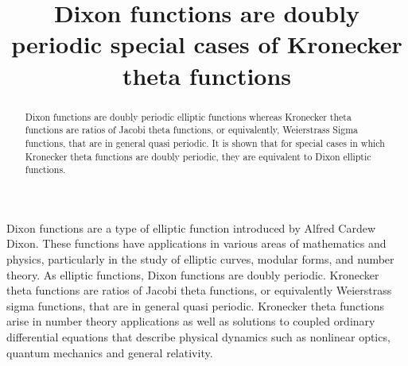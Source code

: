 \documentclass[]{article}
\title{Dixon functions are doubly periodic special cases of Kronecker theta functions}
\author{}
\begin{document}
\maketitle

\begin{abstract}
Dixon functions are doubly periodic elliptic functions whereas Kronecker theta functions are ratios of Jacobi theta functions, or equivalently, Weierstrass Sigma functions, that are in general quasi periodic. It is shown that for special cases in which Kronecker theta functions are doubly periodic, they are equivalent to Dixon elliptic functions.
\end{abstract}

\section{}
Dixon functions are a type of elliptic function introduced by Alfred Cardew Dixon. These functions have applications in various areas of mathematics and physics, particularly in the study of elliptic curves, modular forms, and number theory. As elliptic functions, Dixon functions are doubly periodic. Kronecker theta functions are ratios of Jacobi theta functions, or equivalently Weierstrass sigma functions, that are in general quasi periodic. Kronecker theta functions arise in number theory applications as well as solutions to coupled ordinary differential equations that describe physical dynamics such as nonlinear optics, quantum mechanics and general relativity. 
\end{document}
